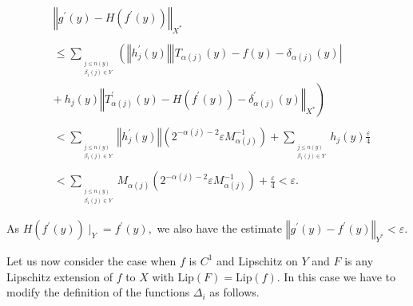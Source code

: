 \documentclass[11pt]{amsproc}%
\theoremstyle{plain}
\numberwithin{equation}{section}
\begin{document}
\medskip%

\begin{align*}
&  \left\Vert g^{\prime}\left(  y\right)  -H\left(  f^{\prime}\left(
y\right)  \right)  \right\Vert _{X^{\ast}}\\
& \\
&  \leq\sum_{_{\substack{j\leq n\left(  y\right)  \\\beta_{1}(j)\in Y}%
}}\left(  \left\Vert h_{j}^{\prime}\left(  y\right)  \right\Vert \left\vert
T_{\alpha(j)}\left(  y\right)  -f\left(  y\right)  -\delta_{\alpha(j)}\left(
y\right)  \right\vert \right. \\
&  \left.  +\ h_{j}\left(  y\right)  \left\Vert T_{\alpha(j)}^{\prime}\text{
}(y)-H(f^{\prime}\left(  y\right)  )-\delta_{\alpha(j)}^{\prime}\left(
y\right)  \right\Vert _{X^{\ast}}\right) \\
& \\
&  <\sum_{_{\substack{j\leq n\left(  y\right)  \\\beta_{1}(j)\in Y}%
}}\left\Vert h_{j}^{\prime}\left(  y\right)  \right\Vert \left(
2^{-\alpha(j)-2}\varepsilon M_{\alpha(j)}^{-1}\right)  +\sum
_{_{\substack{j\leq n\left(  y\right)  \\\beta_{1}(j)\in Y}}}h_{j}\left(
y\right)  \frac{\varepsilon}{4}\\
& \\
&  <\sum_{_{\substack{j\leq n\left(  y\right)  \\\beta_{1}(j)\in Y}}}%
M_{\alpha(j)}\left(  2^{-\alpha(j)-2}\varepsilon M_{\alpha(j)}^{-1}\right)
+\frac{\varepsilon}{4}<\varepsilon.
\end{align*}


\medskip

\noindent As $H\left(  f^{\prime}\left(  y\right)  \right)  \mid_{Y}%
=f^{\prime}\left(  y\right)  ,$ we also have the estimate $\left\Vert
g^{\prime}\left(  y\right)  -f^{\prime}\left(  y\right)  \right\Vert
_{Y^{\ast}}<\varepsilon.$

\medskip

\noindent Let us now consider the case when $f$ is $C^{1}$ and Lipschitz on
$Y$ and $F$ is any Lipschitz extension of $f$ to $X$ with $\text{Lip}%
(F)=\text{Lip}(f)$. In this case we have to modify the definition of the
functions $\Delta_{i}$ as follows.

\medskip
\end{document}
